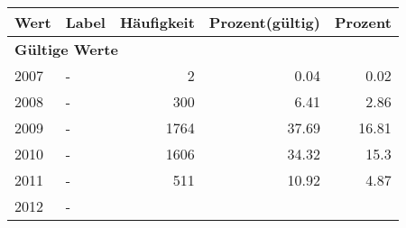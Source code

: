      \begin{longtable}{lXrrr}
     \toprule
     \textbf{Wert} & \textbf{Label} & \textbf{Häufigkeit} & \textbf{Prozent(gültig)} & \textbf{Prozent} \\
     \endhead
     \midrule
     \multicolumn{5}{l}{\textbf{Gültige Werte}}\\

     2007 &
     \multicolumn{1}{X}{ -  } &


       \num{2} &
       \num[round-mode=places,round-precision=2]{0.04} &
         \num[round-mode=places,round-precision=2]{0.02} \\

     2008 &
     \multicolumn{1}{X}{ -  } &


       \num{300} &
       \num[round-mode=places,round-precision=2]{6.41} &
         \num[round-mode=places,round-precision=2]{2.86} \\

     2009 &
     \multicolumn{1}{X}{ -  } &


       \num{1764} &
       \num[round-mode=places,round-precision=2]{37.69} &
         \num[round-mode=places,round-precision=2]{16.81} \\

     2010 &
     \multicolumn{1}{X}{ -  } &


       \num{1606} &
       \num[round-mode=places,round-precision=2]{34.32} &
         \num[round-mode=places,round-precision=2]{15.3} \\

     2011 &
     \multicolumn{1}{X}{ -  } &


       \num{511} &
       \num[round-mode=places,round-precision=2]{10.92} &
         \num[round-mode=places,round-precision=2]{4.87} \\

     2012 &
     \multicolumn{1}{X}{ -  } &



\end{longtable}
